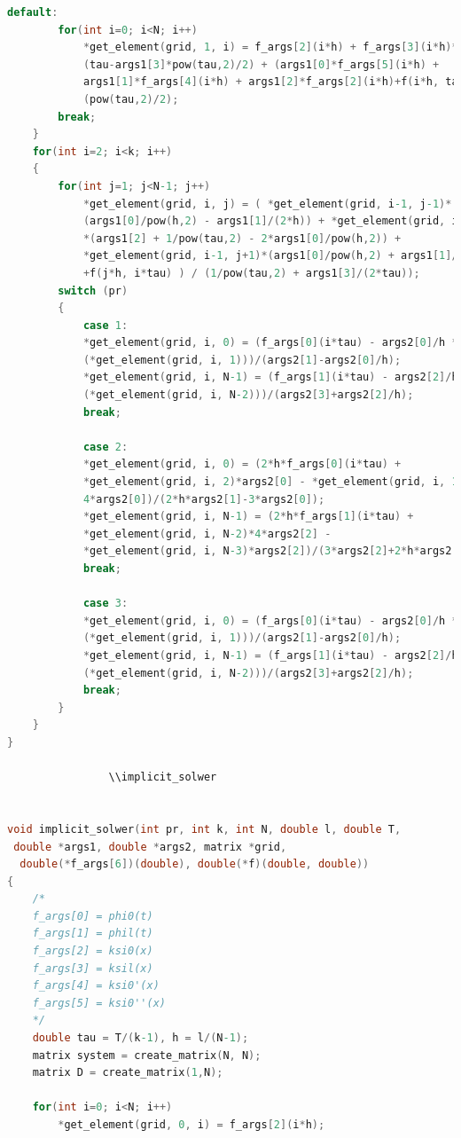 \documentclass[12pt]{article}
\begin{document}
\begin{enumerate}
\begin{lstlisting}[language=C]
        default: 
        for(int i=0; i<N; i++)
            *get_element(grid, 1, i) = f_args[2](i*h) + f_args[3](i*h)*
            (tau-args1[3]*pow(tau,2)/2) + (args1[0]*f_args[5](i*h) + 
            args1[1]*f_args[4](i*h) + args1[2]*f_args[2](i*h)+f(i*h, tau))*
            (pow(tau,2)/2);
        break;
    }
    for(int i=2; i<k; i++)
    {
        for(int j=1; j<N-1; j++)
            *get_element(grid, i, j) = ( *get_element(grid, i-1, j-1)*
            (args1[0]/pow(h,2) - args1[1]/(2*h)) + *get_element(grid, i-1, j)
            *(args1[2] + 1/pow(tau,2) - 2*args1[0]/pow(h,2)) +
            *get_element(grid, i-1, j+1)*(args1[0]/pow(h,2) + args1[1]/(2*h)) 
            +f(j*h, i*tau) ) / (1/pow(tau,2) + args1[3]/(2*tau));
        switch (pr)
        {
            case 1: 
            *get_element(grid, i, 0) = (f_args[0](i*tau) - args2[0]/h *
            (*get_element(grid, i, 1)))/(args2[1]-args2[0]/h);
            *get_element(grid, i, N-1) = (f_args[1](i*tau) - args2[2]/h *
            (*get_element(grid, i, N-2)))/(args2[3]+args2[2]/h);
            break;

            case 2:
            *get_element(grid, i, 0) = (2*h*f_args[0](i*tau) + 
            *get_element(grid, i, 2)*args2[0] - *get_element(grid, i, 1)*
            4*args2[0])/(2*h*args2[1]-3*args2[0]);
            *get_element(grid, i, N-1) = (2*h*f_args[1](i*tau) + 
            *get_element(grid, i, N-2)*4*args2[2] - 
            *get_element(grid, i, N-3)*args2[2])/(3*args2[2]+2*h*args2[3]);
            break;

            case 3: 
            *get_element(grid, i, 0) = (f_args[0](i*tau) - args2[0]/h *
            (*get_element(grid, i, 1)))/(args2[1]-args2[0]/h);
            *get_element(grid, i, N-1) = (f_args[1](i*tau) - args2[2]/h *
            (*get_element(grid, i, N-2)))/(args2[3]+args2[2]/h);
            break;
        }
    }
}

                \\implicit_solwer


void implicit_solwer(int pr, int k, int N, double l, double T,
 double *args1, double *args2, matrix *grid,
  double(*f_args[6])(double), double(*f)(double, double))
{
    /*
    f_args[0] = phi0(t)
    f_args[1] = phil(t)
    f_args[2] = ksi0(x)
    f_args[3] = ksil(x)
    f_args[4] = ksi0'(x)
    f_args[5] = ksi0''(x)
    */
    double tau = T/(k-1), h = l/(N-1);
    matrix system = create_matrix(N, N);
    matrix D = create_matrix(1,N);

    for(int i=0; i<N; i++)
        *get_element(grid, 0, i) = f_args[2](i*h);


\end{lstlisting}
\end{enumerate}
\end{document}
